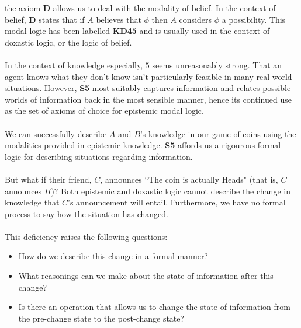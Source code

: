 \documentclass[12pt, a4paper, twoside]{article}
\begin{document}
the axiom {\bf D} allows us to deal with the modality of belief.
In the context of belief, {\bf D} states that if $A$ believes that $\phi$ then
$A$ considers $\phi$ a possibility.
This modal logic has been labelled {\bf KD45} and is usually used in the context
of doxastic logic, or the logic of belief.\\
\\
In the context of knowledge especially, $5$ seems unreasonably strong.
That an agent knows what they don't know isn't particularly feasible in many
real world situations.
However, {\bf S5} most suitably captures information and relates possible
worlds of information back in the most sensible manner, hence its continued use
as the set of axioms of choice for epistemic modal logic.\\
\\
We can successfully describe $A$ and $B$'s knowledge in our game of coins using
the modalities provided in epistemic knowledge.
{\bf S5} affords us a rigourous formal logic for describing situations regarding
information.\\
\\
But what if their friend, $C$, announces ``The coin is actually Heads" (that is,
$C$ announces $H$)?
Both epistemic and doxastic logic cannot describe the change in knowledge that
$C$'s announcement will entail.
Furthermore, we have no formal process to say how the situation has changed.\\
\\
This deficiency raises the following questions:
\begin{itemize}
	\item How do we describe this change in a formal manner?
	\item What reasonings can we make about the state of information after this
	change?
	\item Is there an operation that allows us to change the state of information
	from the pre-change state to the post-change state?
\end{itemize}
\end{document}
